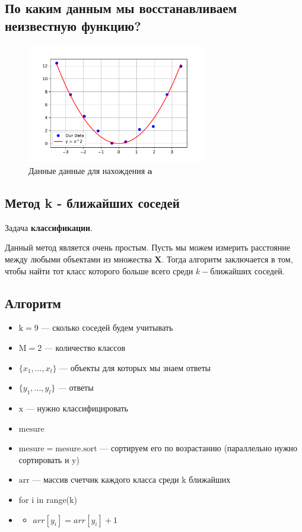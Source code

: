 \subsection{По каким данным мы восстанавливаем неизвестную функцию?}
\begin{figure}[h!t]\center
\includegraphics[width=0.7\textwidth]{section/section2_2.pdf}
\caption{Данные данные для нахождения $\textbf{a}$}
\label{Lecture_2_class}
\end{figure}

\subsection{Метод k - ближайших соседей}
 \begin{center}
Задача {\bf классификации}.
 \end{center}

Данный метод является очень простым. Пусть мы можем измерить расстояние между любыми объектами из множества $\textbf{X}$. Тогда алгоритм заключается в том, чтобы найти тот класс которого больше всего среди $k-$ближайших соседей.

\subsection{Алгоритм}

\begin{itemize}
	\item $\text{k} = 9$  --- сколько соседей будем учитывать
	\item $\text{M} = 2$  --- количество классов
	\item $\{x_1, ..., x_l\}$ --- объекты для которых мы знаем ответы
	\item $\{y_1, ..., y_l\}$ --- ответы
	\item $\text{x}$ --- нужно классифицировать
	\item $\text{mesure}$
	\item $\text{mesure} = \text{mesure}.\text{sort}$ --- сортируем его по возрастанию (параллельно нужно сортировать и $\text{y}$)
	\item $\text{arr}$ --- массив счетчик каждого класса среди $\text{k}$ ближайших
	\item for i in range(k)
	\item	\begin{itemize}
			\item $arr[y_i] = arr[y_i]  + 1$
		\end{itemize}
		
\end{itemize}




